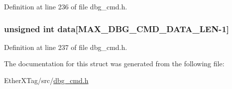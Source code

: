 Definition at line 236 of file dbg\-\_\-cmd.\-h.

\hypertarget{structdbg__cmd__type__get__chip__info_abceed6826af53b88f4cc936fac1716f0}{
\subsubsection[{data}]{\setlength{\rightskip}{0pt plus 5cm}unsigned int data\mbox{[}{\bf M\-A\-X\-\_\-\-D\-B\-G\-\_\-\-C\-M\-D\-\_\-\-D\-A\-T\-A\-\_\-\-L\-E\-N}-\/1\mbox{]}}}\label{structdbg__cmd__type__get__chip__info_abceed6826af53b88f4cc936fac1716f0}


Definition at line 237 of file dbg\-\_\-cmd.\-h.



The documentation for this struct was generated from the following file\-:\begin{DoxyCompactItemize}
\item 
Ether\-X\-Tag/src/\hyperlink{dbg__cmd_8h}{dbg\-\_\-cmd.\-h}\end{DoxyCompactItemize}

